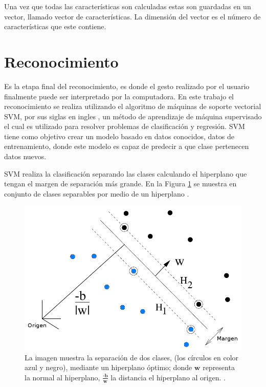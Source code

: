 Una vez que todas las características son calculadas estas son guardadas en un vector, llamado vector de características. La dimensión del vector es el número de características que este contiene. 




\section{Reconocimiento}\label{sec:SVM} 

Es la etapa final del reconocimiento, es donde el gesto realizado por el usuario finalmente puede ser interpretado por la computadora.
En este trabajo el reconocimiento se realiza utilizando el algoritmo de máquinas de soporte vectorial SVM, por sus siglas en ingles \citep{Cortes1995}, un método de aprendizaje de máquina supervisado el cual es utilizado para resolver problemas de clasificación y regresión. SVM tiene como objetivo crear un modelo basado en datos conocidos, datos de entrenamiento, donde este modelo es capaz de predecir a que clase pertenecen datos nuevos. 

SVM realiza la clasificación separando las clases calculando el hiperplano que tengan el margen de separación más grande. En la Figura \ref{fig:SVM} se muestra en conjunto de clases separables por medio de un hiperplano .  

\begin{figure}[h!]
\begin{center}
\includegraphics[scale=.55]{./Figures/SVMarticle.png}
\end{center}
\caption{La imagen muestra la separación de dos clases, (los círculos en color azul y negro), mediante un hiperplano óptimo; donde $\textbf{w}$ representa la normal al hiperplano, $\frac{\textbf{-b}}{\textbf{w}}$ la distancia el hiperplano al origen. \protect\citep{Burges1998}.}
\label{fig:SVM}
\end{figure} 

